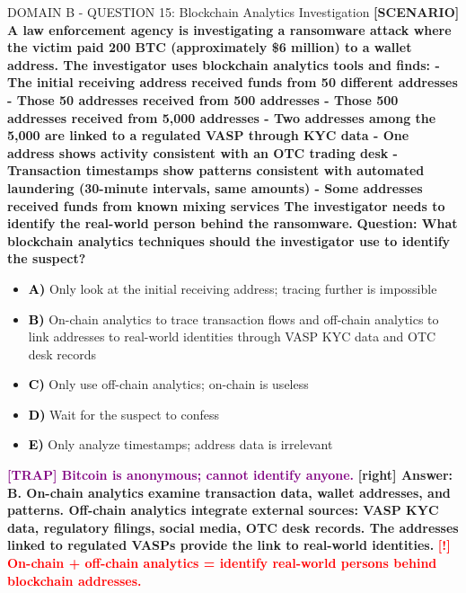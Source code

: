 \documentclass[11pt,a4paper]{beamer}
\newcommand{\redflag}[1]{\textcolor{red}{\textbf{[!] #1}}}
\newcommand{\trap}[1]{\textcolor{purple}{\textbf{[TRAP] #1}}}
\newcommand{\correct}[1]{\textcolor{green!50!black}{\textbf{[right] #1}}}
\newcommand{\scenario}[1]{\textcolor{blue!70!black}{\textbf{[SCENARIO] #1}}}
\newcommand{\option}[1]{\textcolor{black}{\textbf{#1}}}
\begin{document}
\begin{frame}{DOMAIN B - QUESTION 15: Blockchain Analytics Investigation}
\scenario{A law enforcement agency is investigating a ransomware attack where the victim paid 200 BTC (approximately \$6 million) to a wallet address. The investigator uses blockchain analytics tools and finds:
- The initial receiving address received funds from 50 different addresses
- Those 50 addresses received from 500 addresses
- Those 500 addresses received from 5,000 addresses
- Two addresses among the 5,000 are linked to a regulated VASP through KYC data
- One address shows activity consistent with an OTC trading desk
- Transaction timestamps show patterns consistent with automated laundering (30-minute intervals, same amounts)
- Some addresses received funds from known mixing services
The investigator needs to identify the real-world person behind the ransomware.}
\vspace{0.2cm}
\textbf{Question: What blockchain analytics techniques should the investigator use to identify the suspect?}
\vspace{0.1cm}
\begin{itemize}
    \item \option{A)} Only look at the initial receiving address; tracing further is impossible
    \item \option{B)} On-chain analytics to trace transaction flows and off-chain analytics to link addresses to real-world identities through VASP KYC data and OTC desk records
    \item \option{C)} Only use off-chain analytics; on-chain is useless
    \item \option{D)} Wait for the suspect to confess
    \item \option{E)} Only analyze timestamps; address data is irrelevant
\end{itemize}
\vspace{0.2cm}
\trap{Bitcoin is anonymous; cannot identify anyone.}
\correct{Answer: B. On-chain analytics examine transaction data, wallet addresses, and patterns. Off-chain analytics integrate external sources: VASP KYC data, regulatory filings, social media, OTC desk records. The addresses linked to regulated VASPs provide the link to real-world identities.}
\redflag{On-chain + off-chain analytics = identify real-world persons behind blockchain addresses.}
\end{frame}
\end{document}

